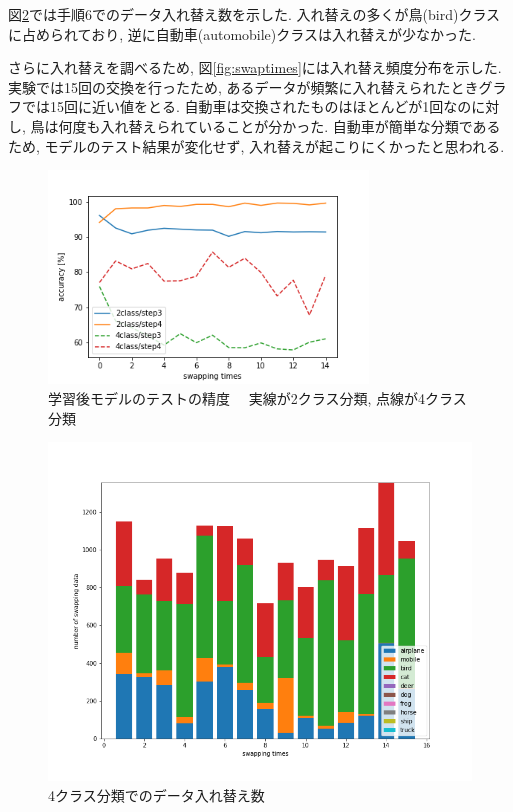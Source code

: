 \documentclass[twocolumn]{jarticle}     %
\begin{document}
図\ref{fig:swapclass}では手順6でのデータ入れ替え数を示した. 入れ替えの多くが鳥(bird)クラスに占められており, 逆に自動車(automobile)クラスは入れ替えが少なかった.

さらに入れ替えを調べるため, 図\ref{fig:swaptimes}には入れ替え頻度分布を示した. 実験では15回の交換を行ったため, あるデータが頻繁に入れ替えられたときグラフでは15回に近い値をとる. 自動車は交換されたものはほとんどが1回なのに対し, 鳥は何度も入れ替えられていることが分かった. 自動車が簡単な分類であるため, モデルのテスト結果が変化せず, 入れ替えが起こりにくかったと思われる.

\begin{figure}[tb]
	\begin{center}
		\includegraphics[clip,width=8.5cm]{accuracy.png}
		\caption{学習後モデルのテストの精度　
		実線が2クラス分類,
    点線が4クラス分類}
		\label{fig:accuracy}
	\end{center}
\end{figure}
\begin{figure}[tb]
	\begin{center}
		\includegraphics[clip,width=13cm]{swapclass4.png}
		\caption{4クラス分類でのデータ入れ替え数　}
		\label{fig:swapclass}
	\end{center}
\end{figure}
\end{document}
